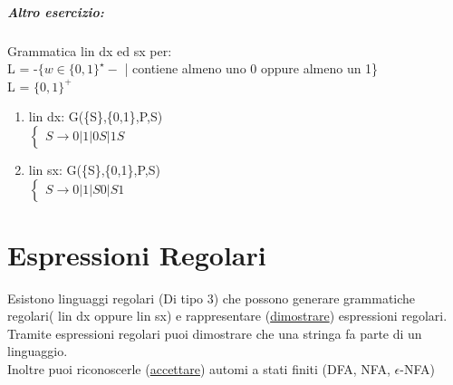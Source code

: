 \documentclass[12pt, a4paper, openany, oneside]{book}
\begin{document}
\paragraph{Altro esercizio: } Grammatica lin dx ed sx per:\\
L = -$\{w\in \{0,1\}^{\star}-$ | contiene almeno uno 0 oppure almeno un 1\}\\
L = $\{0,1\}^{+}$
\begin{enumerate}
	\item lin dx: G(\{S\},\{0,1\},P,S)\\
	$\begin{cases}
	S \to 0|1|0S|1S
	\end{cases}$
	\item lin sx: G(\{S\},\{0,1\},P,S)\\
	$\begin{cases}
	S \to 0|1|S0|S1
	\end{cases}$
\end{enumerate}
\chapter{Espressioni Regolari}
Esistono linguaggi regolari (Di tipo 3) che possono generare grammatiche regolari(
lin dx oppure lin sx) e rappresentare (\underline{dimostrare}) espressioni 
regolari.\\
Tramite espressioni regolari puoi dimostrare che una stringa fa parte di un 
linguaggio.\\
Inoltre puoi riconoscerle (\underline{accettare}) automi a stati finiti (DFA, 
NFA, $\epsilon$-NFA)
\end{document}

